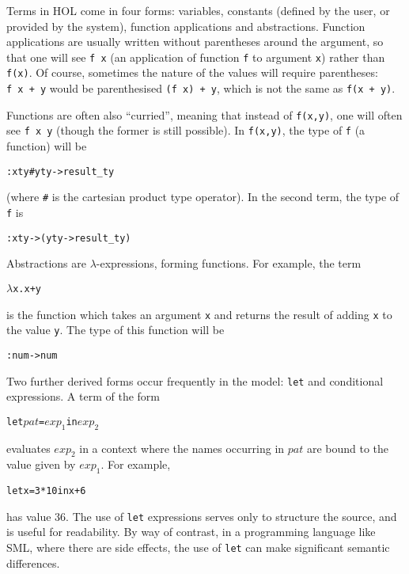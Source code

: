\documentclass[11pt]{article}
\begin{document}
Terms in HOL come in four forms: variables, constants (defined by the
user, or provided by the system), function applications and
abstractions.  Function applications are usually written without
parentheses around the argument, so that one will see \texttt{f~x} (an
application of function \texttt{f} to argument \texttt{x}) rather than
\texttt{f(x)}.  Of course, sometimes the nature of the values will
require parentheses: \texttt{f~x~+~y} would be parenthesised
\texttt{(f~x)~+~y}, which is not the same as \texttt{f(x~+~y)}.

Functions are often also ``curried'', meaning that instead of
\texttt{f(x,y)}, one will often see \texttt{f~x~y} (though the former
is still possible).  In \texttt{f(x,y)}, the type of \texttt{f} (a
function) will be
\begin{alltt}
   :xty # yty -> result\_ty
\end{alltt}
(where \texttt{\#} is the cartesian product type operator).  In the
second term, the type of \texttt{f} is
\begin{alltt}
   :xty -> (yty -> result\_ty)
\end{alltt}

\noindent
Abstractions are $\lambda$-expressions, forming functions.  For
example, the term
\begin{alltt}
   \(\lambda\)x. x + y
\end{alltt}
is the function which takes an argument \texttt{x} and returns the
result of adding \texttt{x} to the value \texttt{y}.  The type of this
function will be
\begin{alltt}
   :num -> num
\end{alltt}

\vspace{1ex}
\noindent Two further derived forms occur frequently in the \cpp{}
model: \texttt{let} and conditional expressions.
%
%
A term of the form
\begin{alltt}
   let \(\mathit{pat}\) = \(\mathit{exp}_1\) in \(\mathit{exp}_2\)
\end{alltt}
evaluates $\mathit{exp}_2$ in a context where the names occurring in
$\mathit{pat}$ are bound to the value given by $\mathit{exp}_1$.  For
example,
\begin{alltt}
   let x = 3 * 10 in x + 6
\end{alltt}
has value 36.  The use of \texttt{let} expressions serves only to
structure the source, and is useful for readability.  By way of
contrast, in a programming language like SML, where there are side
effects, the use of \texttt{let} can make significant semantic
differences.
\end{document}
